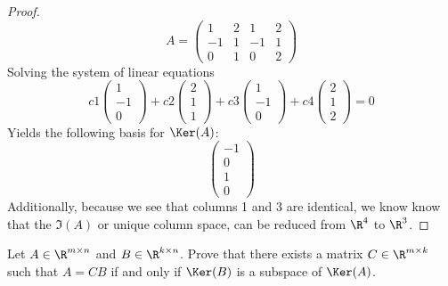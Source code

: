\documentclass[11pt,nocut]{article}
\begin{document}
\begin{problem}[3 points]
\begin{enumerate}[label=\normalfont(\textbf{\alph*})]
\begin{proof}
		$$A = 
			\begin{pmatrix}
				1 & 2 & 1 & 2 \\
				-1 & 1 & -1 & 1 \\
				0 & 1 & 0 & 2 
			\end{pmatrix}
		$$
		Solving the system of linear equations
		$$ 	c1 \begin{pmatrix}
				1 \\
				-1  \\
				0 
			\end{pmatrix}
			+ c2 \begin{pmatrix}
				2 \\
				1  \\
				1  
			\end{pmatrix}
			+ c3 \begin{pmatrix}
				 1  \\
				 -1 \\
				 0  
			\end{pmatrix}
			+ c4 \begin{pmatrix}
				 2 \\
				 1 \\
				 2 
			\end{pmatrix} = 0
		$$
		Yields the following basis for $\Ker(A)$:
		$$ \begin{pmatrix}
				-1 \\
				0 \\
				1 \\
				0 
			\end{pmatrix}
		$$
		Additionally, because we see that columns 1 and 3 are identical, we know know that the $\Im(A)$ or unique column space, can be reduced from $\R^4$ to $\R^3$.
		\end{proof}
	\end{enumerate}
\end{problem}

\vspace{5mm}

\begin{problem}[$\star$]
	Let $A \in \R^{m \times n}$ and $B \in \R^{k \times n}$. 
	Prove that there exists a matrix $C \in \R^{m \times k}$ such that $A = CB$ if and only if $\Ker(B)$ is a subspace of $\Ker(A)$.
\end{problem}
\vspace{1mm}

\vspace{1cm}
\centerline{}

%
%
\end{document}
